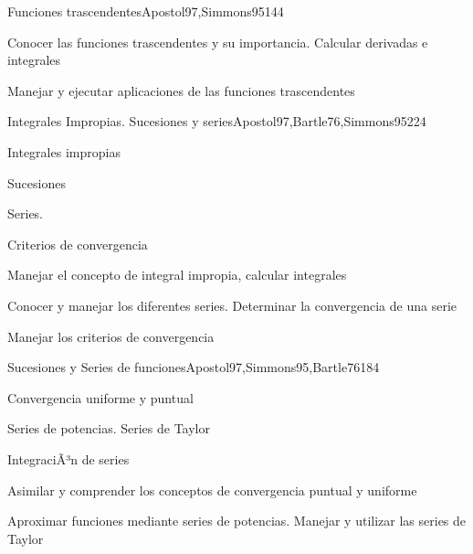 \begin{syllabus}
\begin{unit}{Funciones trascendentes}{Apostol97,Simmons95}{14}{4}
   \begin{learningoutcomes}
      \item Conocer las funciones trascendentes y su importancia. Calcular derivadas e integrales
      \item Manejar y ejecutar aplicaciones de las funciones trascendentes
      \end{learningoutcomes}
\end{unit}

\begin{unit}{Integrales Impropias. Sucesiones y series}{Apostol97,Bartle76,Simmons95}{22}{4}
   \begin{topics}
      \item Integrales impropias
      \item Sucesiones
      \item Series.
      \item Criterios de convergencia
   \end{topics}

   \begin{learningoutcomes}
      \item Manejar el concepto de integral impropia, calcular integrales
      \item Conocer y manejar los diferentes series. Determinar la convergencia de una serie
      \item Manejar los criterios de convergencia
      \end{learningoutcomes}
\end{unit}

\begin{unit}{Sucesiones y Series de funciones}{Apostol97,Simmons95,Bartle76}{18}{4}
   \begin{topics}
      \item Convergencia uniforme y puntual
      \item Series de potencias. Series de Taylor
      \item IntegraciÃ³n de series
   \end{topics}

   \begin{learningoutcomes}
      \item Asimilar y comprender los conceptos de convergencia puntual y uniforme
      \item Aproximar funciones mediante series de potencias. Manejar y utilizar las series de Taylor
      \end{learningoutcomes}
\end{unit}


\end{syllabus}
